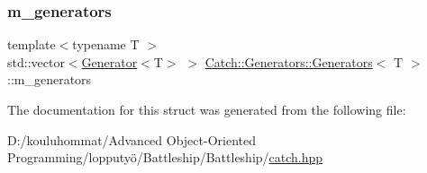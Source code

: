 \subsubsection{\texorpdfstring{m\+\_\+generators}{m\_generators}}
{\footnotesize\ttfamily template$<$typename T $>$ \\
std\+::vector$<$\mbox{\hyperlink{class_catch_1_1_generators_1_1_generator}{Generator}}$<$T$>$ $>$ \mbox{\hyperlink{struct_catch_1_1_generators_1_1_generators}{Catch\+::\+Generators\+::\+Generators}}$<$ T $>$\+::m\+\_\+generators}



The documentation for this struct was generated from the following file\+:\begin{DoxyCompactItemize}
\item 
D\+:/kouluhommat/\+Advanced Object-\/\+Oriented Programming/lopputyö/\+Battleship/\+Battleship/\mbox{\hyperlink{catch_8hpp}{catch.\+hpp}}\end{DoxyCompactItemize}
